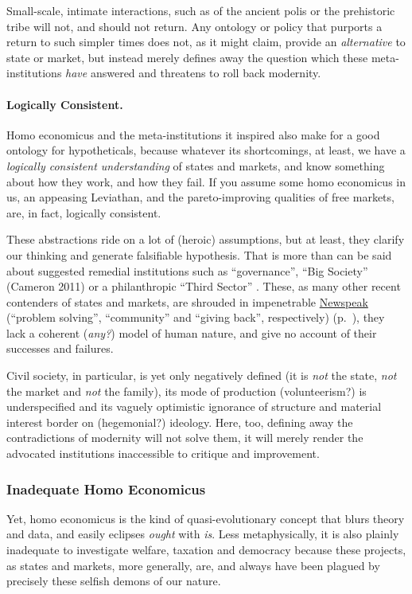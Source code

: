 {Small-scale, intimate interactions, such as of the ancient polis or the prehistoric tribe will not, and should not return.
Any ontology or policy that purports a return to such simpler times does not, as it might claim, provide an \emph{alternative} to state or market, but instead merely defines away the question which these meta-institutions \emph{have} answered and threatens to roll back modernity.

\paragraph{Logically Consistent.}
Homo economicus and the meta-institutions it inspired also make for a good ontology for hypotheticals, because whatever its shortcomings, at least, we have a \emph{logically consistent understanding} of states and markets, and know something about how they work, and how they fail.
If you assume some homo economicus in us, an appeasing Leviathan, and the pareto-improving qualities of free markets, are, in fact, logically consistent.

These abstractions ride on a lot of (heroic) assumptions, but at least, they clarify our thinking and generate falsifiable hypothesis.
That is more than can be said about suggested remedial institutions such as ``governance'', ``Big Society'' (Cameron 2011) or a philanthropic ``Third Sector'' \citep{Anheier2002}.
These, as many other recent contenders of states and markets, are shrouded in impenetrable \hyperref[sec:newspeak]{Newspeak} (``problem solving'', ``community'' and ``giving back'', respectively) (p.~\pageref{sec:newspeak}), they lack a coherent (\emph{any?}) model of human nature, and give no account of their successes and failures.

Civil society, in particular, is yet only negatively defined (it is \emph{not} the state, \emph{not} the market and \emph{not} the family), its mode of production (volunteerism?) is underspecified and its vaguely optimistic ignorance of structure and material interest border on (hegemonial?) ideology.
Here, too, defining away the contradictions of modernity will not solve them, it will merely render the advocated institutions inaccessible to critique and improvement.

\subsubsection{Inadequate Homo Economicus}
Yet, homo economicus is the kind of quasi-evolutionary concept that blurs theory and data, and easily eclipses \emph{ought} with \emph{is}.
Less metaphysically, it is also plainly inadequate to investigate welfare, taxation and democracy because these projects, as states and markets, more generally, are, and always have been plagued by precisely these selfish demons of our nature.

}
